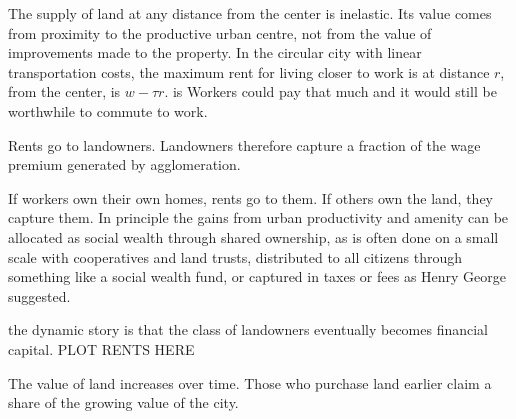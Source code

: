 
The supply of land at any distance from the center is inelastic. 
Its value comes from proximity to the productive urban centre, not from the value of improvements made to the property. 
In the circular city with linear transportation costs, the maximum rent for living closer to work is at distance $r$, from the center, is $w-\tau r$.  is Workers could pay that much and it would still be worthwhile to commute to work. 

Rents go to landowners. %
Landowners therefore capture a fraction of the wage premium generated by agglomeration.

If workers own their own homes, rents go to them. If others own the land, they capture them. %
In principle the gains from urban productivity and amenity can be allocated as social wealth through shared ownership, as is often done on a small scale with cooperatives and land trusts, distributed to all citizens through something like a social wealth fund, or captured in taxes or fees as Henry George suggested. 

the dynamic story is that the class of landowners eventually becomes financial capital.
PLOT RENTS HERE

The value of land increases over time. Those who purchase land earlier claim a share of the growing value of the city. %
 
